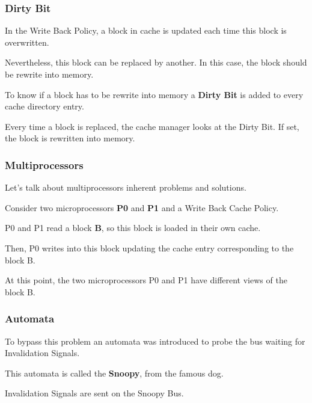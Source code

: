 
\begin{frame}
  \frametitle{Dirty Bit}

  In the Write Back Policy, a block in cache is updated each time this
  block is overwritten.

  \-

  Nevertheless, this block can be replaced by another. In this case, the
  block should be rewrite into memory.

  \-

  To know if a block has to be rewrite into memory a \textbf{Dirty Bit} is
  added to every cache directory entry.

  \-

  Every time a block is replaced, the cache manager looks at the Dirty Bit.
  If set, the block is rewritten into memory.
\end{frame}


\begin{frame}
  \frametitle{Multiprocessors}

  Let's talk about multiprocessors inherent problems and solutions.

  \-

  Consider two microprocessors \textbf{P0} and \textbf{P1} and a Write
  Back Cache Policy.

  \-

  P0 and P1 read a block \textbf{B}, so this block is loaded in their
  own cache.

  \-

  Then, P0 writes into this block updating the cache entry corresponding to
  the block B.

  \-

  At this point, the two microprocessors P0 and P1 have different
  views of the block B.
\end{frame}


\begin{frame}
  \frametitle{Automata}

  To bypass this problem an automata was introduced to probe the bus
  waiting for Invalidation Signals.

  \-

  This automata is called the \textbf{Snoopy}, from the famous dog.

  \-

  Invalidation Signals are sent on the Snoopy Bus.
\end{frame}

